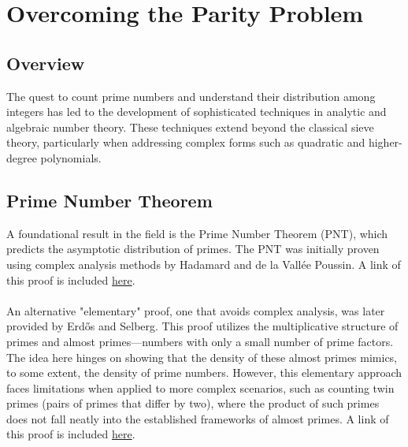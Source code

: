 \documentclass[10pt]{extarticle}
\begin{document}
\pagebreak
\section{Overcoming the Parity Problem}
\subsection{Overview}
The quest to count prime numbers and understand their distribution among integers has led to the development of sophisticated techniques in analytic and algebraic number theory. 
These techniques extend beyond the classical sieve theory, particularly when addressing complex forms such as quadratic and higher-degree polynomials.

\subsection{Prime Number Theorem}
A foundational result in the field is the Prime Number Theorem (PNT), which predicts the asymptotic distribution of primes. The PNT was initially proven using complex analysis methods by Hadamard and de la Vallée Poussin. A link of this proof is included \href{https://people.mpim-bonn.mpg.de/zagier/files/doi/10.2307/2975232/fulltext.pdf}{here}. \\
\\
An alternative "elementary" proof, one that avoids complex analysis, was later provided by Erdős and Selberg. This proof utilizes the multiplicative structure of primes and almost primes—numbers with only a small number of prime factors. The idea here hinges on showing that the density of these almost primes mimics, to some extent, the density of prime numbers. However, this elementary approach faces limitations when applied to more complex scenarios, such as counting twin primes (pairs of primes that differ by two), where the product of such primes does not fall neatly into the established frameworks of almost primes. A link of this proof is included \href{https://www.math.columbia.edu/~goldfeld/ErdosSelbergDispute.pdf}{here}.
\end{document}
